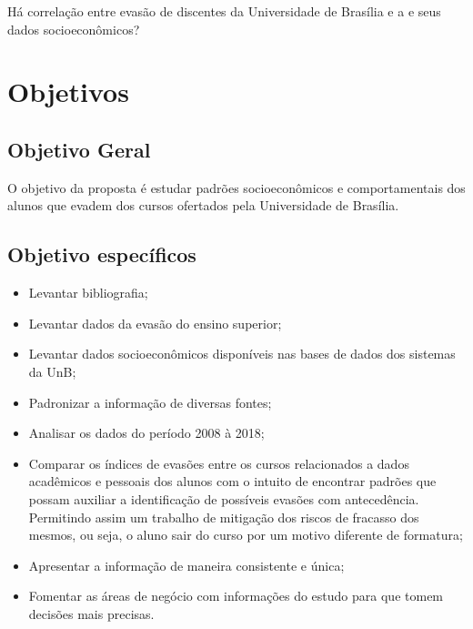 Há correlação entre evasão de discentes da Universidade de Brasília e a e seus dados socioeconômicos?
\section{Objetivos}%

\subsection{Objetivo Geral}

O objetivo da proposta é estudar padrões socioeconômicos e comportamentais dos alunos que evadem dos cursos ofertados pela Universidade de Brasília. 
 
\subsection{Objetivo específicos}

\begin{enumerate} 
    \begin{itemize}
        \item   Levantar bibliografia;
        \item   Levantar dados da evasão do ensino superior;
        \item   Levantar dados socioeconômicos disponíveis nas bases de dados dos sistemas da UnB;
        \item	Padronizar a informação de diversas fontes;
        \item	Analisar os dados do período 2008 à 2018;
        \item   Comparar os índices de evasões entre os cursos relacionados a dados acadêmicos e pessoais dos alunos com o intuito  de encontrar padrões que possam auxiliar a identificação de possíveis evasões com antecedência. Permitindo assim um trabalho de mitigação dos riscos de fracasso dos mesmos, ou seja, o aluno sair do curso por um motivo diferente de formatura;
        \item	Apresentar a informação de maneira consistente e única;
        \item	Fomentar as áreas de negócio com informações do estudo para que tomem decisões mais precisas.
        
    \end{itemize}%
\end{enumerate}%


